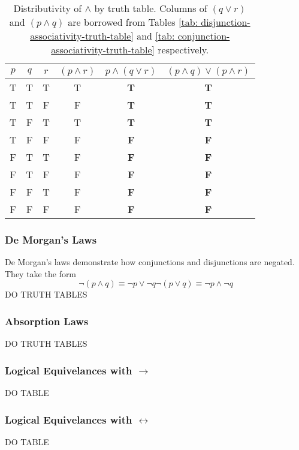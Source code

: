 \documentclass[twocolumn]{report}
\begin{document}
\begin{table}[h]
	\centering
	\begin{tabular}{ccc|c|c|c}
		$p$ & $q$ & $r$ & $(p \wedge r)$ & $p \wedge (q \lor r) $ & $(p \wedge q) \lor (p \wedge r)$ \\ \hline
		T & T & T & T & \textbf{T} & \textbf{T}  \\
		T & T & F & F & \textbf{T} & \textbf{T}  \\
		T & F & T & T & \textbf{T} & \textbf{T}  \\
		T & F & F & F & \textbf{F} & \textbf{F}  \\
		F & T & T & F & \textbf{F} & \textbf{F}  \\
		F & T & F & F & \textbf{F} & \textbf{F}  \\
		F & F & T & F & \textbf{F} & \textbf{F}  \\
		F & F & F & F & \textbf{F} & \textbf{F}  \\
	\end{tabular}
	\caption{Distributivity of $\wedge$ by truth table. Columns of $(q\lor r)$ and $(p \wedge q)$ are borrowed from Tables \ref{tab: disjunction-associativity-truth-table} and \ref{tab: conjunction-associativity-truth-table} respectively.}
	\label{tab: conjunction-distributivity-truth-table}
\end{table}

\subsubsection{De Morgan's Laws}
De Morgan's laws demonstrate how conjunctions and disjunctions are negated. 
They take the form
\begin{subequations}
	\begin{equation}
		\neg (p\wedge q) \equiv \neg p \lor \neg q
		\label{eqn: negation-of-conjunction}
	\end{equation}
	\begin{equation}
		\neg (p\lor q) \equiv \neg p \wedge \neg q
		\label{eqn: negation-of-disjunction}
	\end{equation}
\end{subequations}
DO TRUTH TABLES
\subsubsection{Absorption Laws}
DO TRUTH TABLES
\subsubsection{Logical Equivelances with $\rightarrow$}
DO TABLE
\subsubsection{Logical Equivelances with $\leftrightarrow$}
DO TABLE
\end{document}

